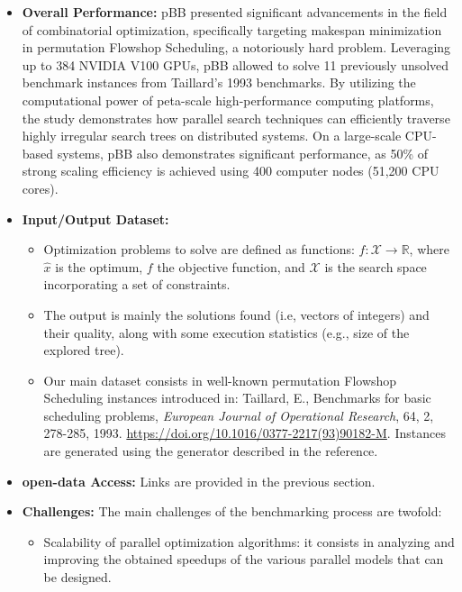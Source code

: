 \begin{itemize}
    \item \textbf{Overall Performance:}
    pBB presented significant advancements in the field of combinatorial optimization, specifically targeting makespan minimization in permutation Flowshop Scheduling, a notoriously hard problem. Leveraging up to 384 NVIDIA V100 GPUs, pBB allowed to solve 11 previously unsolved benchmark instances from Taillard's 1993 benchmarks. By utilizing the computational power of peta-scale high-performance computing platforms, the study demonstrates how parallel search techniques can efficiently traverse highly irregular search trees on distributed systems.
    On a large-scale CPU-based systems, pBB also demonstrates significant performance, as 50\% of strong scaling efficiency is achieved using 400 computer nodes (51,200 CPU cores).
    \item \textbf{Input/Output Dataset:} %
        \begin{itemize}
            \item Optimization problems to solve are defined as functions: ${f: \mathcal{X} \rightarrow \mathbb{R}}$, where $\hat{x}$ is the optimum, $f$ the objective function, and $\mathcal{X}$ is the search space incorporating a set of constraints.
            \item The output is mainly the solutions found (i.e, vectors of integers) and their quality, along with some execution statistics (e.g., size of the explored tree).
            \item Our main dataset consists in well-known permutation Flowshop Scheduling instances introduced in: Taillard, E., Benchmarks for basic scheduling problems, \textit{European Journal of Operational Research}, 64, 2, 278-285, 1993. \url{https://doi.org/10.1016/0377-2217(93)90182-M}. Instances are generated using the generator described in the reference.
        \end{itemize}
    \item \textbf{open-data Access:} Links are provided in the previous section.
    \item \textbf{Challenges:} 
    The main challenges of the benchmarking process are twofold:
    \begin{itemize}
        \item Scalability of parallel optimization algorithms: it consists in analyzing and improving the obtained speedups of the various parallel models that can be designed.

\end{itemize}
\end{itemize}
